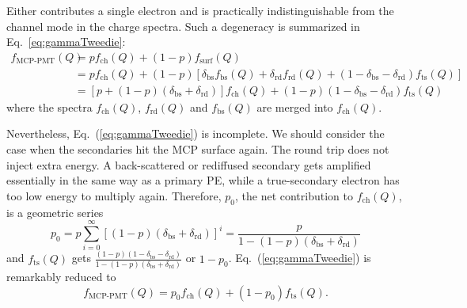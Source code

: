 Either contributes a single electron and is practically indistinguishable from
the channel mode in the charge spectra. Such a degeneracy is summarized in Eq.~\eqref{eq:gammaTweedie}:
\begin{equation}
	\label{eq:gammaTweedie}
	\begin{aligned}
		f_{\text{MCP-PMT}}(Q) & = p f_{\mathrm{ch}}(Q) + (1-p) f_{\mathrm{surf}}(Q)                                                                                                                                    \\
		                      & = p f_{\mathrm{ch}}(Q)+(1-p) [\delta_{\mathrm{bs}} f_{\mathrm{bs}}(Q) + \delta_{\mathrm{rd}} f_{\mathrm{rd}}(Q) + (1- \delta_{\mathrm{bs}} - \delta_{\mathrm{rd}}) f_{\mathrm{ts}}(Q)] \\
		                      & = [p + (1-p)(\delta_{\mathrm{bs}} + \delta_{\mathrm{rd}})] f_{\mathrm{ch}}(Q) + (1-p)(1-\delta_{\mathrm{bs}} - \delta_{\mathrm{rd}})f_{\mathrm{ts}}(Q)
	\end{aligned}
\end{equation}
where the spectra $f_{\mathrm{ch}}(Q)$, $f_{\mathrm{rd}}(Q)$ and $f_{\mathrm{bs}}(Q)$ are
merged into $f_{\mathrm{ch}}(Q)$.

Nevertheless, Eq.~(\ref{eq:gammaTweedie}) is incomplete.
We should consider the case when the secondaries hit the MCP surface again.
The round trip does not inject extra energy.
A back-scattered or rediffused secondary gets amplified essentially in the same way
as a primary PE, while a true-secondary electron has too low energy to multiply again.
Therefore, \(p_0\), the net contribution to \(f_{\mathrm{ch}}(Q)\), is a geometric series
\begin{equation}
	\label{eq:p0}
	p_0 = p \sum_{{i}=0}^\infty [(1-p) (\delta_{\mathrm{bs}} + \delta_{\mathrm{rd}})]^{i} = \frac{p}{1 - (1-p) (\delta_{\mathrm{bs}} + \delta_{\mathrm{rd}})}
\end{equation}
and \(f_{\mathrm{ts}}(Q)\) gets \(\frac{(1-p)(1-\delta_{\mathrm{bs}} - \delta_{\mathrm{rd}})}{1 - (1-p) (\delta_{\mathrm{bs}} + \delta_{\mathrm{rd}})}\) or \(1-p_0\).
Eq.~(\ref{eq:gammaTweedie}) is remarkably reduced to
\begin{equation}
	\label{eq:1}
	f_{\text{MCP-PMT}}(Q) = p_0 f_{\mathrm{ch}}(Q) + (1-p_0) f_{\mathrm{ts}}(Q).
\end{equation}

